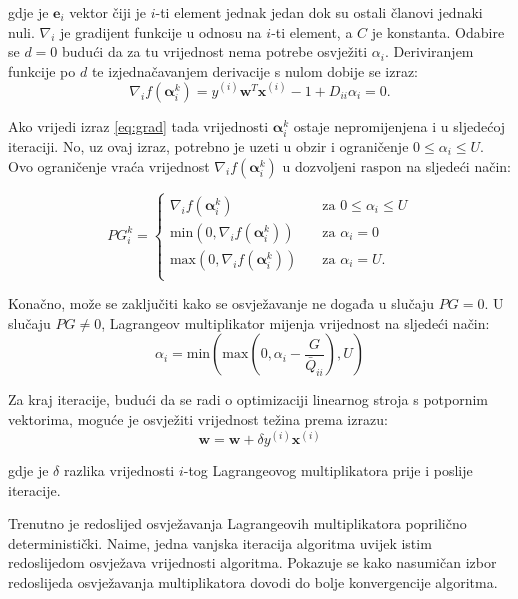 \documentclass[times, utf8, zavrsni, numeric]{fer}
\newcommand{\iteralpha}{\boldsymbol{\alpha}_i^{k}}
\begin{document}
gdje je $\textbf{e}_i$ vektor čiji je $i$-ti element jednak jedan dok su ostali članovi jednaki nuli.
$\nabla_i$ je gradijent funkcije u odnosu na $i$-ti element, a $C$ je konstanta. 
Odabire se $d=0$ budući da za tu vrijednost nema potrebe osvježiti $\alpha_i$.
Deriviranjem funkcije po $d$ te izjednačavanjem derivacije s nulom dobije se
izraz:
\begin{equation} \label{eq:grad}
  \nabla_if(\iteralpha) = y^{(i)}\mathbf{w}^T\mathbf{x}^{(i)} - 1 + D_{ii}\alpha_i= 0.
\end{equation}

Ako vrijedi izraz \ref{eq:grad} tada vrijednosti $\iteralpha$ ostaje nepromijenjena i u sljedećoj iteraciji.
No, uz ovaj izraz, potrebno je uzeti u obzir i ograničenje $0 \leq \alpha_i \leq U$.
Ovo ograničenje vraća vrijednost $\nabla_if(\iteralpha)$ u dozvoljeni raspon na sljedeći način:

\begin{equation} \label{eq:proj}
   PG_i^{k} =
  \begin{cases}
    \nabla_if(\iteralpha)                 & \quad \text{za } 0 \leq \alpha_i \leq U\\
    \text{min}(0, \nabla_if(\iteralpha))  & \quad \text{za } \alpha_i = 0\\
    \text{max}(0, \nabla_if(\iteralpha))  & \quad \text{za } \alpha_i = U.\\
  \end{cases}
\end{equation}

Konačno, može se zaključiti kako se osvježavanje ne događa u slučaju $PG=0$.
U slučaju $PG \neq 0 $, Lagrangeov multiplikator mijenja vrijednost na sljedeći način:
\begin{equation} \label{eq:mulnovi}
  \alpha_i = \text{min}(\text{max}(0, \alpha_i - \frac{G}{\bar{Q}_{ii}}), U)
\end{equation}

Za kraj iteracije, budući da se radi o optimizaciji linearnog stroja s potpornim vektorima, moguće je
osvježiti vrijednost težina prema izrazu:
\begin{equation} \label{eq:teznove}
  \textbf{w} = \textbf{w} +  \delta y^{(i)}\textbf{x}^{(i)}
\end{equation}

gdje je $\delta$ razlika vrijednosti $i$-tog Lagrangeovog multiplikatora prije i poslije iteracije.

\par Trenutno je redoslijed osvježavanja Lagrangeovih multiplikatora poprilično deterministički.
Naime, jedna vanjska iteracija algoritma uvijek istim redoslijedom osvježava vrijednosti algoritma.
Pokazuje se kako nasumičan izbor redoslijeda osvježavanja multiplikatora dovodi do bolje konvergencije
algoritma.
\end{document}

